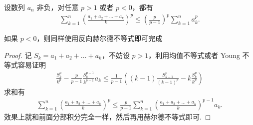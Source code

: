 \documentclass[../../main.tex]{subfiles}
\begin{document}
\begin{corollary}[离散版Hardy不等式]\label{corollary:离散版Hardy(哈代)不等式}
设数列 $a_n$ 非负，对任意 $p > 1$ 或者 $p < 0$，都有
\begin{align*}
\sum_{k=1}^n \left( \frac{a_1 + a_2 + \dots + a_k}{k} \right)^p \leqslant \left( \frac{p}{p - 1} \right)^p \sum_{k=1}^n a_k^p.
\end{align*}
\end{corollary}
\begin{remark}
如果 $p < 0$，则同样使用反向赫尔德不等式即可完成
\end{remark}
\begin{proof}
记 $S_k = a_1 + a_2 + \dots + a_k$，不妨设 $p > 1$，利用均值不等式或者 Young 不等式容易证明
\begin{align*}
\frac{S_k^p}{k^p} - \frac{p}{p - 1} \frac{S_k^{p - 1}}{k^{p - 1}} a_k \leqslant \frac{1}{p - 1} \left( (k - 1) \frac{S_{k - 1}^p}{(k - 1)^p} - k \frac{S_k^p}{k^p} \right)
\end{align*}
求和有
\begin{align*}
\sum_{k=1}^n \left( \frac{a_1 + a_2 + \dots + a_k}{k} \right)^p \leqslant \frac{p}{p - 1} \sum_{k=1}^n \left( \frac{a_1 + a_2 + \dots + a_k}{k} \right)^{p - 1} a_k.
\end{align*}
效果上就和前面分部积分完全一样，然后再用赫尔德不等式即可.
\end{proof}
\end{document}
